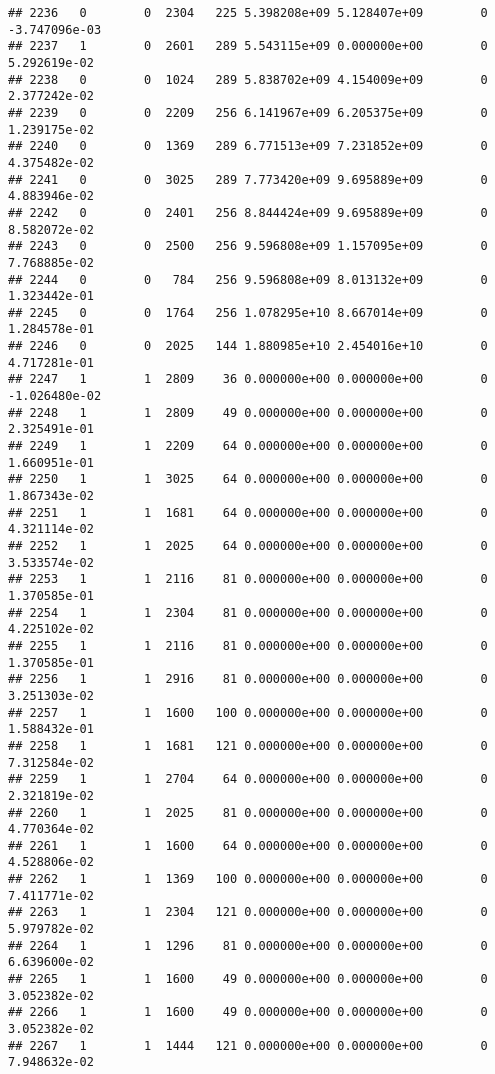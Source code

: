 \documentclass[
]{article}
\begin{document}
\begin{enumerate}
\begin{verbatim}
## 2236   0        0  2304   225 5.398208e+09 5.128407e+09        0 -3.747096e-03
## 2237   1        0  2601   289 5.543115e+09 0.000000e+00        0  5.292619e-02
## 2238   0        0  1024   289 5.838702e+09 4.154009e+09        0  2.377242e-02
## 2239   0        0  2209   256 6.141967e+09 6.205375e+09        0  1.239175e-02
## 2240   0        0  1369   289 6.771513e+09 7.231852e+09        0  4.375482e-02
## 2241   0        0  3025   289 7.773420e+09 9.695889e+09        0  4.883946e-02
## 2242   0        0  2401   256 8.844424e+09 9.695889e+09        0  8.582072e-02
## 2243   0        0  2500   256 9.596808e+09 1.157095e+09        0  7.768885e-02
## 2244   0        0   784   256 9.596808e+09 8.013132e+09        0  1.323442e-01
## 2245   0        0  1764   256 1.078295e+10 8.667014e+09        0  1.284578e-01
## 2246   0        0  2025   144 1.880985e+10 2.454016e+10        0  4.717281e-01
## 2247   1        1  2809    36 0.000000e+00 0.000000e+00        0 -1.026480e-02
## 2248   1        1  2809    49 0.000000e+00 0.000000e+00        0  2.325491e-01
## 2249   1        1  2209    64 0.000000e+00 0.000000e+00        0  1.660951e-01
## 2250   1        1  3025    64 0.000000e+00 0.000000e+00        0  1.867343e-02
## 2251   1        1  1681    64 0.000000e+00 0.000000e+00        0  4.321114e-02
## 2252   1        1  2025    64 0.000000e+00 0.000000e+00        0  3.533574e-02
## 2253   1        1  2116    81 0.000000e+00 0.000000e+00        0  1.370585e-01
## 2254   1        1  2304    81 0.000000e+00 0.000000e+00        0  4.225102e-02
## 2255   1        1  2116    81 0.000000e+00 0.000000e+00        0  1.370585e-01
## 2256   1        1  2916    81 0.000000e+00 0.000000e+00        0  3.251303e-02
## 2257   1        1  1600   100 0.000000e+00 0.000000e+00        0  1.588432e-01
## 2258   1        1  1681   121 0.000000e+00 0.000000e+00        0  7.312584e-02
## 2259   1        1  2704    64 0.000000e+00 0.000000e+00        0  2.321819e-02
## 2260   1        1  2025    81 0.000000e+00 0.000000e+00        0  4.770364e-02
## 2261   1        1  1600    64 0.000000e+00 0.000000e+00        0  4.528806e-02
## 2262   1        1  1369   100 0.000000e+00 0.000000e+00        0  7.411771e-02
## 2263   1        1  2304   121 0.000000e+00 0.000000e+00        0  5.979782e-02
## 2264   1        1  1296    81 0.000000e+00 0.000000e+00        0  6.639600e-02
## 2265   1        1  1600    49 0.000000e+00 0.000000e+00        0  3.052382e-02
## 2266   1        1  1600    49 0.000000e+00 0.000000e+00        0  3.052382e-02
## 2267   1        1  1444   121 0.000000e+00 0.000000e+00        0  7.948632e-02

\end{verbatim}
\end{enumerate}
\end{document}
